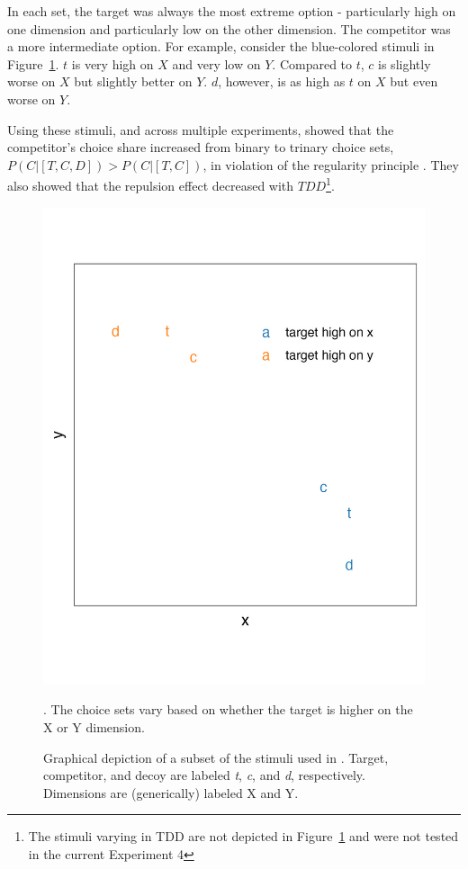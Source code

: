 In each set, the target was always the most extreme option - particularly high on one dimension and particularly low on the other dimension. The competitor was a more intermediate option. For example, consider the blue-colored stimuli in Figure~\ref{fig:banerjee_stim}. $t$ is very high on $X$ and very low on $Y$. Compared to $t$, $c$ is slightly worse on $X$ but slightly better on $Y$. $d$, however, is as high as $t$ on $X$ but even worse on $Y$. 

Using these stimuli, and across multiple experiments, \textcite{banerjeeFactorsThatPromote2024} showed that the competitor's choice share increased from binary to trinary choice sets, $P(C|[T,C,D])>P(C|[T,C])$, in violation of the regularity principle \parencite{marley1989random}. They also showed that the repulsion effect decreased with $TDD$\footnote{The stimuli varying in TDD are not depicted in Figure~\ref{fig:banerjee_stim} and were not tested in the current Experiment 4}.

\begin{figure}
    \includegraphics{figures/banerjee_stim.jpeg}
    \caption{Graphical depiction of a subset of the stimuli used in \textcite{banerjeeFactorsThatPromote2024}. Target, competitor, and decoy are labeled \textit{t}, \textit{c}, and \textit{d}, respectively. Dimensions are (generically) labeled X and Y.}. The choice sets vary based on whether the target is higher on the X or Y dimension.
    \label{fig:banerjee_stim}
\end{figure}

